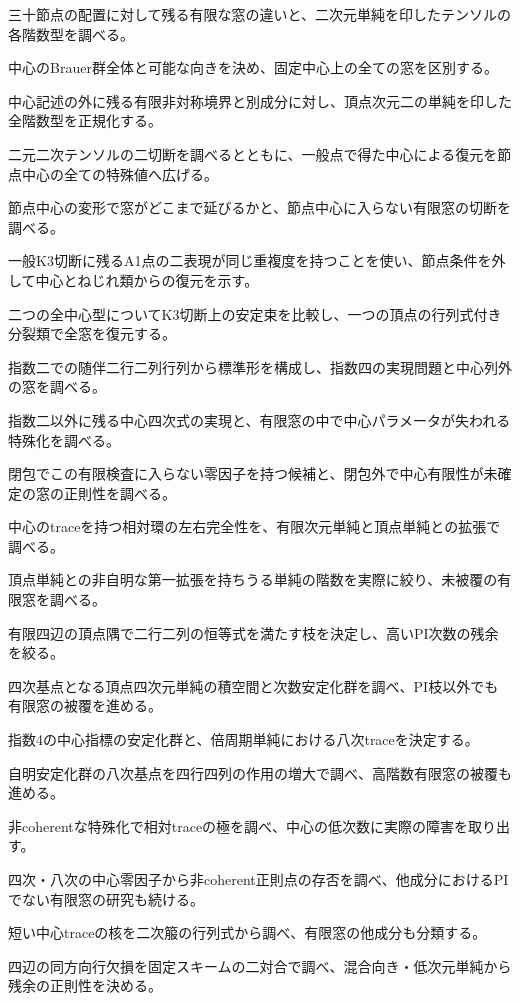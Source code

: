 \documentclass[11pt,a4paper]{ltjsarticle}
\begin{document}
三十節点の配置に対して残る有限な窓の違いと、二次元単純を印したテンソルの各階数型を調べる。

中心のBrauer群全体と可能な向きを決め、固定中心上の全ての窓を区別する。

中心記述の外に残る有限非対称境界と別成分に対し、頂点次元二の単純を印した全階数型を正規化する。

二元二次テンソルの二切断を調べるとともに、一般点で得た中心による復元を節点中心の全ての特殊値へ広げる。

節点中心の変形で窓がどこまで延びるかと、節点中心に入らない有限窓の切断を調べる。

一般K3切断に残るA1点の二表現が同じ重複度を持つことを使い、節点条件を外して中心とねじれ類からの復元を示す。

二つの全中心型についてK3切断上の安定束を比較し、一つの頂点の行列式付き分裂類で全窓を復元する。

指数二での随伴二行二列行列から標準形を構成し、指数四の実現問題と中心列外の窓を調べる。

指数二以外に残る中心四次式の実現と、有限窓の中で中心パラメータが失われる特殊化を調べる。

閉包でこの有限検査に入らない零因子を持つ候補と、閉包外で中心有限性が未確定の窓の正則性を調べる。


中心のtraceを持つ相対環の左右完全性を、有限次元単純と頂点単純との拡張で調べる。

頂点単純との非自明な第一拡張を持ちうる単純の階数を実際に絞り、未被覆の有限窓を調べる。

有限四辺の頂点隅で二行二列の恒等式を満たす枝を決定し、高いPI次数の残余を絞る。


四次基点となる頂点四次元単純の積空間と次数安定化群を調べ、PI枝以外でも有限窓の被覆を進める。

指数4の中心指標の安定化群と、倍周期単純における八次traceを決定する。

自明安定化群の八次基点を四行四列の作用の増大で調べ、高階数有限窓の被覆も進める。


非coherentな特殊化で相対traceの極を調べ、中心の低次数に実際の障害を取り出す。

四次・八次の中心零因子から非coherent正則点の存否を調べ、他成分におけるPIでない有限窓の研究も続ける。

短い中心traceの核を二次箙の行列式から調べ、有限窓の他成分も分類する。

四辺の同方向行欠損を固定スキームの二対合で調べ、混合向き・低次元単純から残余の正則性を決める。
\end{document}
